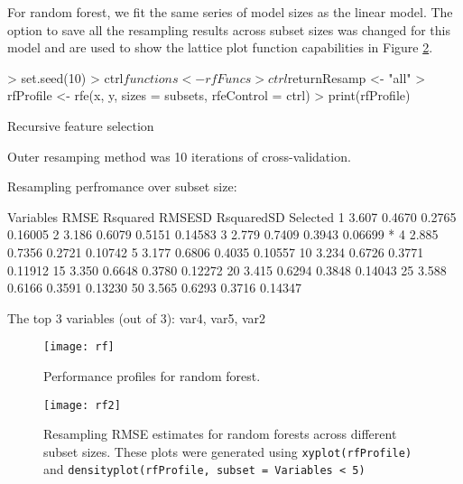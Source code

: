 \documentclass[12pt]{article}
\begin{document}
For random forest, we fit the same series of model sizes as the linear model. The option to save all the resampling results across subset sizes was changed for this model and are used to show the lattice plot function capabilities in Figure \ref{F:rf2}.
\begin{Schunk}
\begin{Sinput}
> set.seed(10)
> ctrl$functions <- rfFuncs
> ctrl$returnResamp <- "all"
> rfProfile <- rfe(x, y, sizes = subsets, rfeControl = ctrl)
> print(rfProfile)
\end{Sinput}
\begin{Soutput}
Recursive feature selection

Outer resamping method was 10 iterations of cross-validation. 

Resampling perfromance over subset size:

 Variables  RMSE Rsquared RMSESD RsquaredSD Selected
         1 3.607   0.4670 0.2765    0.16005         
         2 3.186   0.6079 0.5151    0.14583         
         3 2.779   0.7409 0.3943    0.06699        *
         4 2.885   0.7356 0.2721    0.10742         
         5 3.177   0.6806 0.4035    0.10557         
        10 3.234   0.6726 0.3771    0.11912         
        15 3.350   0.6648 0.3780    0.12272         
        20 3.415   0.6294 0.3848    0.14043         
        25 3.588   0.6166 0.3591    0.13230         
        50 3.565   0.6293 0.3716    0.14347         

The top 3 variables (out of 3):
   var4, var5, var2
\end{Soutput}
\end{Schunk}

\begin{figure}
   \begin{center}		
      \texttt{[image: rf]}
      \caption{Performance profiles for random forest.}
      \label{F:rf} 
    \end{center}
\end{figure}

\begin{figure}
   \begin{center}		
      \texttt{[image: rf2]}
      \caption{Resampling RMSE estimates for random forests across different subset sizes. These plots were generated using \texttt{xyplot(rfProfile)} and \texttt{densityplot(rfProfile, subset = Variables < 5)}}
      \label{F:rf2} 
    \end{center}
\end{figure}
\end{document}
